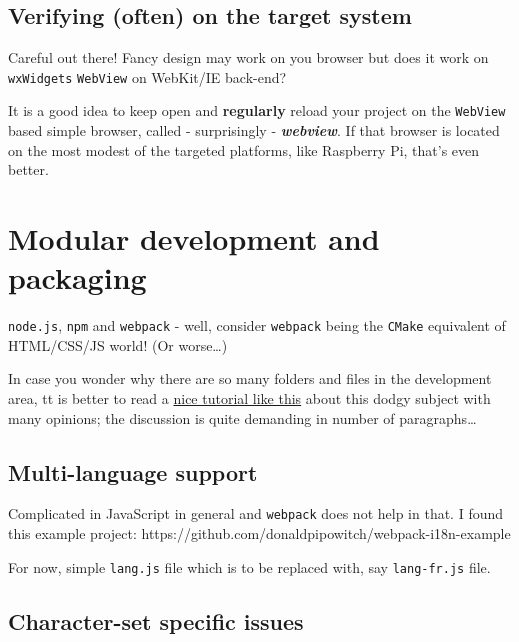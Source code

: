 \documentclass[11pt]{article}
\begin{document}
    \hypertarget{verifying-often-on-the-target-system}{%
\subsection{Verifying (often) on the target
system}\label{verifying-often-on-the-target-system}}

    Careful out there! Fancy design may work on you browser but does it work
on \texttt{wxWidgets} \texttt{WebView} on WebKit/IE back-end?

    It is a good idea to keep open and \textbf{regularly} reload your
project on the \texttt{WebView} based simple browser, called -
surprisingly - \textbf{\emph{webview}}. If that browser is located on
the most modest of the targeted platforms, like Raspberry Pi, that's
even better.

    \hypertarget{modular-development-and-packaging}{%
\section{Modular development and
packaging}\label{modular-development-and-packaging}}

    \texttt{node.js}, \texttt{npm} and \texttt{webpack} - well, consider
\texttt{webpack} being the \texttt{CMake} equivalent of HTML/CSS/JS
world! (Or worse\ldots)

    In case you wonder why there are so many folders and files in the
development area, tt is better to read a
\href{https://medium.com/dev-bits/everything-i-know-about-writing-modular-javascript-applications-37c125d8eddf}{nice
tutorial like this} about this dodgy subject with many opinions; the
discussion is quite demanding in number of paragraphs\ldots{}

    \hypertarget{multi-language-support}{%
\subsection{Multi-language support}\label{multi-language-support}}

    Complicated in JavaScript in general and \texttt{webpack} does not help
in that. I found this example project:
https://github.com/donaldpipowitch/webpack-i18n-example

    For now, simple \texttt{lang.js} file which is to be replaced with, say
\texttt{lang-fr.js} file.

    \hypertarget{character-set-specific-issues}{%
\subsection{Character-set specific
issues}\label{character-set-specific-issues}}
\end{document}
